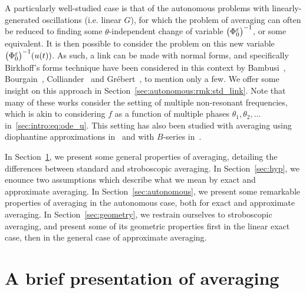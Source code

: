 \medskip%
A particularly well-studied case is that of the autonomous problems with
linearly-generated oscillations (i.e. linear $G$), for which the problem
of averaging can often be reduced to finding some $\theta$-independent
change of variable $\big( \Phi^\varepsilon_0 \big) ^{-1}$, or some equivalent. It
is then possible to consider the problem on this new variable
$\big(\Phi^\varepsilon_0 \big)^{-1} (u(t))$. As such, a link can be made with
normal forms, and specifically Birkhoff's forms technique have been
considered in this context by Bambusi~\cite{bambusi.2003.birkhoff, bambusi.2005.birkhoff-lewis, bambusi.2006.birkhoff, bambusi.2008.birkhoff},
Bourgain~\cite{bourgain.1996.construction},
Colliander~\cite{colliander.2010.transfer, colliander.2012.remark} and
Grébert~\cite{bambusi.2006.birkhoff, grebert.2011.energy,
grebert.2012.resonant}, to mention only a few. We offer some insight on
this approach in Section~\ref{sec:autonomous:rmk:std_link}.
%
Note that many of these works consider the setting of multiple
non-resonant frequencies, which is akin to considering $f$ as a function
of multiple phases $\theta_1, \theta_2, \ldots$
in~\eqref{sec:intro:eq:ode_u}. This setting has also been studied with
averaging using diophantine approximations
in~\cite{chartier.2017.convergence} and with $B$-series
in~\cite{chartier.2012.higher}. 

\bigskip %
In Section~\ref{sec:presentation}, we present some general properties of
averaging, detailing the differences between standard and stroboscopic
averaging. In Section~\ref{sec:hyp}, we enounce two assumptions which
describe what we mean by exact and approximate averaging. In
Section~\ref{sec:autonomous}, we present some remarkable properties of
averaging in the autonomous case, both for exact and approximate
averaging. In Section~\ref{sec:geometry}, we restrain ourselves to
stroboscopic averaging, and present some of its geometric properties
first in the linear exact case, then in the general case of approximate
averaging.


\section{A brief presentation of averaging} \label{sec:presentation}


